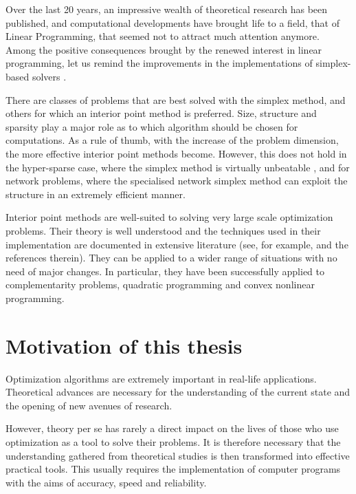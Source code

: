 Over the last 20 years, an impressive wealth of theoretical research
has been published, and computational developments have brought life
to a field, that of Linear Programming, that seemed not to attract much
attention anymore.
Among the positive consequences brought by the renewed interest in linear
programming, let us remind the improvements in the implementations of 
simplex-based solvers \cite{Bixby94,Bixby02}.

There are classes of problems that are best solved with the simplex
method, and others for which an interior point method is preferred.
Size, structure and sparsity play a major role as to which
algorithm should be chosen for computations.
As a rule of thumb, with the increase of the problem dimension, the 
more effective interior point methods become.
However, this does not hold in the hyper-sparse case, where the
simplex method is virtually unbeatable \cite{Bixby02,HallMcKinnon05}, 
and for network problems,
where the specialised network simplex method can exploit the
structure in an extremely efficient manner.

Interior point methods are well-suited to solving very
large scale optimization problems. Their theory is well understood
\cite{RoosTerlakyVial,ipm:Wright97,Ye97} 
and the techniques used in their implementation 
are documented in extensive literature (see, for example, 
\cite{AndersenGondzioMeszarosXu,GondzioTerlaky,LustigMarstenShanno94} 
and the references therein).
They can be applied to a wider range of situations with no need
of major changes. In particular, they have been successfully applied to
complementarity problems, quadratic programming and convex 
nonlinear programming.


%
%
\section{Motivation of this thesis}

Optimization algorithms are extremely important in real-life 
applications. Theoretical advances are necessary for the 
understanding of the current state and the opening of new avenues 
of research. 

However, theory per se has rarely a direct impact on the lives 
of those who use optimization as a tool to solve their problems.
It is therefore necessary that the understanding gathered from
theoretical studies is then transformed into effective practical
tools. This usually requires the implementation of computer programs
with the aims of accuracy, speed and reliability.

